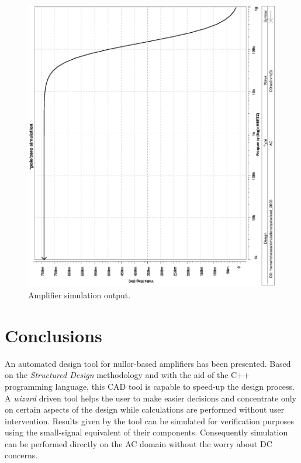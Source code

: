 \documentclass[twocolumn]{IEEEtran}
\begin{document}
\begin{figure}[hbtp]
	\centering
	\includegraphics[scale=0.3,angle=-90]{figuras/iced_2006.ps}
	\caption{Amplifier simulation output.}
	\label{fig:sim}
\end{figure}

\section{Conclusions}
An automated design tool for nullor-based amplifiers has been presented. Based on the {\it Structured Design} methodology and with the aid of the C++ programming language, this CAD tool is capable to speed-up the design process. A {\it wizard} driven tool helps the user to make easier decisions and concentrate only on certain aspects of the design while calculations are performed without user intervention. Results given by the tool can be simulated for verification purposes using the small-signal equivalent of their components. Consequently simulation can be performed directly on the AC domain without the worry about DC concerns.


\end{document}
